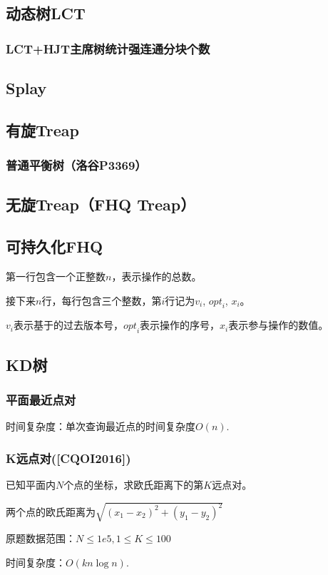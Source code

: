 \documentclass{article}
\begin{document}
\subsection{动态树LCT}
\subsubsection{}
\subsubsection{LCT+HJT主席树统计强连通分块个数}



\subsection{Splay}
\subsection{有旋Treap}
\subsubsection{普通平衡树（洛谷P3369）}

\subsection{无旋Treap（FHQ Treap）}


\subsection{可持久化FHQ}
第一行包含一个正整数$n$，表示操作的总数。\par
接下来$n$行，每行包含三个整数，第$i$行记为${v}_{i}$, ${opt}_i$, $x_i$。\par
$v_i$表示基于的过去版本号，${opt}_i$表示操作的序号，$x_i$表示参与操作的数值。



\subsection{KD树}
\subsubsection{平面最近点对}
时间复杂度：单次查询最近点的时间复杂度$O(n).$

\subsubsection{K远点对([CQOI2016])}
已知平面内$N$个点的坐标，求欧氏距离下的第$K$远点对。\par
两个点的欧氏距离为$\sqrt{(x_1-x_2)^{2}+(y_1-y_2)^{2}}$\par
原题数据范围：$N\leq 1e5, 1\leq K\leq 100$\par
时间复杂度：$O(kn\log{n}).$

\end{document}

